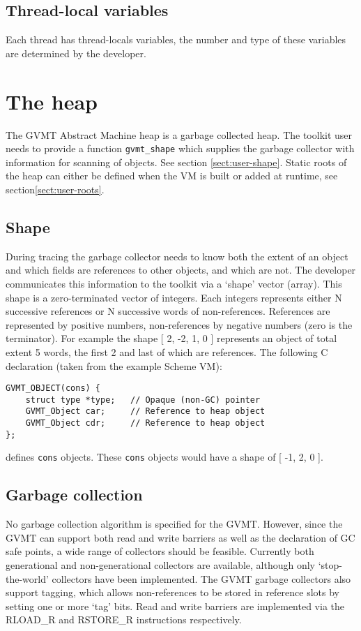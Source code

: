 \subsection{Thread-local variables}
Each thread has thread-locals variables, the number and type of these variables are determined by the developer.

\section{The heap}
The GVMT Abstract Machine heap is a garbage collected heap. The toolkit user needs to provide a function \verb|gvmt_shape| which supplies the garbage collector with information for scanning of objects. See section \ref{sect:user-shape}.
Static roots of the heap can either be defined when the VM is built or added at runtime, see section\ref{sect:user-roots}.

\subsection{Shape\label{sect:shape}}
During tracing the garbage collector needs to know both the extent of an object and which fields are references to other objects, and which are not. The developer communicates this information to the toolkit via a `shape' vector (array).
This shape is a zero-terminated vector of integers. Each integers represents either N successive references or N successive words of non-references. References are represented by positive numbers, non-references by negative numbers (zero is the terminator).
For example the shape [ 2, -2, 1, 0 ] represents an object of total extent 5 words, the first 2 and last of which are references.
The following C declaration (taken from the example Scheme VM):
\begin{verbatim}
GVMT_OBJECT(cons) {   
    struct type *type;   // Opaque (non-GC) pointer
    GVMT_Object car;     // Reference to heap object
    GVMT_Object cdr;     // Reference to heap object
};
\end{verbatim}
defines \verb|cons| objects. These \verb|cons| objects would have a shape of [ -1, 2, 0 ].

\subsection{Garbage collection}
No garbage collection algorithm is specified for the GVMT. However, since the GVMT can support both read and write barriers as well as the declaration of GC safe points, a wide range of collectors should be feasible.
Currently both generational and non-generational collectors are available, although only `stop-the-world' collectors have been implemented. The GVMT garbage collectors also support tagging, which allows non-references to be stored in reference slots by setting one or more `tag' bits.
Read and write barriers are implemented via the RLOAD\_R and RSTORE\_R instructions respectively. 

